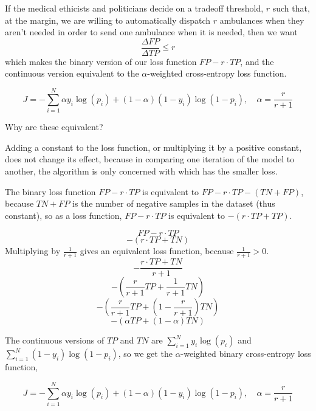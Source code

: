 If the medical ethicists and politicians decide on a tradeoff threshold, $r$ such that, at the margin, we are willing to automatically dispatch $r$ ambulances when they aren't needed in order to send one ambulance when it is needed, then we want $$\frac{\Delta FP}{\Delta TP} \le r$$
which makes the binary version of our loss function $FP - r\cdot TP$, and the continuous version equivalent to the $\alpha$-weighted cross-entropy loss function.

$$J = -\sum_{i=1}^N \alpha y_i \log( p_i) + (1-\alpha)(1-y_i) \log( 1 - p_i), \quad \alpha = \frac{r}{r+1}$$

Why are these equivalent?

Adding a constant to the loss function, or multiplying it by a positive constant, does not change its effect, because in comparing one iteration of the model to another, the algorithm is only concerned with which has the smaller loss.

The binary loss function $FP - r \cdot TP$ is equivalent to $FP - r \cdot TP - (TN+FP)$, because $TN+FP$ is the number of negative samples in the dataset (thus constant), so as a loss function,
$FP - r \cdot TP$ is equivalent to $-(r \cdot TP+ TP)$.


$$FP - r \cdot TP$$
$$-(r \cdot TP + TN)$$
Multiplying by $\frac{1}{r+1}$ gives an equivalent loss function, because $\frac{1}{r+1}>0$.
$$-\frac{r \cdot TP + TN}{r+1}$$
$$- \left( \frac{r}{r+1} TP + \frac{1}{r+1} TN\right)$$
$$- \left( \frac{r}{r+1} TP + \left( 1 - \frac{r}{r+1} \right) TN \right)$$
$$- (\alpha TP + (1 - \alpha) TN) $$

The continuous versions of $TP$ and $TN$ are 
$ \displaystyle \sum_{i=1}^N y_i \log( p_i)$
and
$ \displaystyle \sum_{i=1}^N (1-y_i) \log( 1 - p_i)$, so we get the $\alpha$-weighted binary cross-entropy loss function, 

$$J = -\sum_{i=1}^N \alpha y_i \log( p_i) + (1-\alpha)(1-y_i) \log( 1 - p_i), \quad \alpha = \frac{r}{r+1}$$

